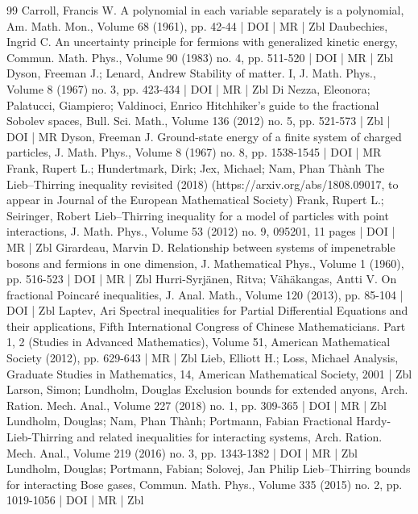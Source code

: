 \begin{thebibliography}{99}
Carroll, Francis W. A polynomial in each variable separately is a polynomial, Am. Math. Mon., Volume 68 (1961), pp. 42-44 | DOI | MR | Zbl
Daubechies, Ingrid C. An uncertainty principle for fermions with generalized kinetic energy, Commun. Math. Phys., Volume 90 (1983) no. 4, pp. 511-520 | DOI | MR | Zbl
Dyson, Freeman J.; Lenard, Andrew Stability of matter. I, J. Math. Phys., Volume 8 (1967) no. 3, pp. 423-434 | DOI | MR | Zbl
Di Nezza, Eleonora; Palatucci, Giampiero; Valdinoci, Enrico Hitchhiker’s guide to the fractional Sobolev spaces, Bull. Sci. Math., Volume 136 (2012) no. 5, pp. 521-573 | Zbl | DOI | MR
Dyson, Freeman J. Ground-state energy of a finite system of charged particles, J. Math. Phys., Volume 8 (1967) no. 8, pp. 1538-1545 | DOI | MR
Frank, Rupert L.; Hundertmark, Dirk; Jex, Michael; Nam, Phan Thành The Lieb–Thirring inequality revisited (2018) (https://arxiv.org/abs/1808.09017, to appear in Journal of the European Mathematical Society)
Frank, Rupert L.; Seiringer, Robert Lieb–Thirring inequality for a model of particles with point interactions, J. Math. Phys., Volume 53 (2012) no. 9, 095201, 11 pages | DOI | MR | Zbl
Girardeau, Marvin D. Relationship between systems of impenetrable bosons and fermions in one dimension, J. Mathematical Phys., Volume 1 (1960), pp. 516-523 | DOI | MR | Zbl
Hurri-Syrjänen, Ritva; Vähäkangas, Antti V. On fractional Poincaré inequalities, J. Anal. Math., Volume 120 (2013), pp. 85-104 | DOI | Zbl
Laptev, Ari Spectral inequalities for Partial Differential Equations and their applications, Fifth International Congress of Chinese Mathematicians. Part 1, 2 (Studies in Advanced Mathematics), Volume 51, American Mathematical Society (2012), pp. 629-643 | MR | Zbl
Lieb, Elliott H.; Loss, Michael Analysis, Graduate Studies in Mathematics, 14, American Mathematical Society, 2001 | Zbl
Larson, Simon; Lundholm, Douglas Exclusion bounds for extended anyons, Arch. Ration. Mech. Anal., Volume 227 (2018) no. 1, pp. 309-365 | DOI | MR | Zbl
Lundholm, Douglas; Nam, Phan Thành; Portmann, Fabian Fractional Hardy-Lieb-Thirring and related inequalities for interacting systems, Arch. Ration. Mech. Anal., Volume 219 (2016) no. 3, pp. 1343-1382 | DOI | MR | Zbl
Lundholm, Douglas; Portmann, Fabian; Solovej, Jan Philip Lieb–Thirring bounds for interacting Bose gases, Commun. Math. Phys., Volume 335 (2015) no. 2, pp. 1019-1056 | DOI | MR | Zbl

\end{thebibliography}
